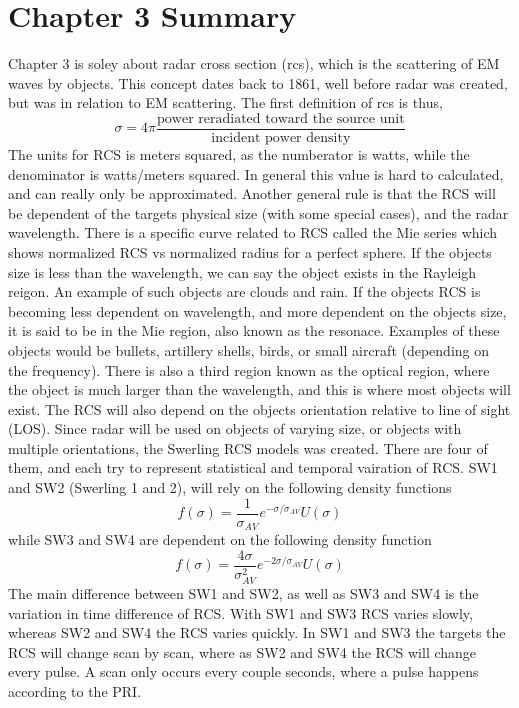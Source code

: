 \documentclass[12pt]{article}
\begin{document}
\section{Chapter 3 Summary}
Chapter 3 is soley about radar cross section (rcs), which is the scattering of EM waves by objects. This concept dates back to 1861, well before radar was created, but was in relation to EM scattering. The first definition of rcs is thus, 
\begin{equation}
    \sigma = 4 \pi \frac{ \mbox{power reradiated toward the source unit} }{ \mbox{incident power density}}
\end{equation}
The units for RCS is meters squared, as the numberator is watts, while the denominator is watts/meters squared. In general this value is hard to calculated, and can really only be approximated. Another general rule is that the RCS will be dependent of the targets physical size (with some special cases), and the radar wavelength. There is a specific curve related to RCS called the Mie series which shows normalized RCS vs normalized radius for a perfect sphere. 
If the objects size is less than the wavelength, we can say the object exists in the Rayleigh reigon. An example of such objects are clouds and rain. If the objects RCS is becoming less dependent on wavelength, and more dependent on the objects size, it is said to be in the Mie region, also known as the resonace. Examples of these objects would be bullets, artillery shells, birds, or small aircraft (depending on the frequency). There is also a third region known as the optical region, where the object is much larger than the wavelength, and this is where most objects will exist. 
The RCS will also depend on the objects orientation relative to line of sight (LOS). Since radar will be used on objects of varying size, or objects with multiple orientations, the Swerling RCS models was created. There are four of them, and each try to represent statistical and temporal vairation of RCS. SW1 and SW2 (Swerling 1 and 2), will rely on the following density functions
\begin{equation}
    f (\sigma) = \frac{1}{\sigma_{AV}} e^{-\sigma / \sigma_{AV}} U(\sigma)
\end{equation}
while SW3 and SW4 are dependent on the following density function
\begin{equation}
    f (\sigma) = \frac{4 \sigma}{\sigma^2_{AV}} e^{-2\sigma / \sigma_{AV}} U(\sigma)
\end{equation}
The main difference between SW1 and SW2, as well as SW3 and SW4 is the variation in time difference of RCS. With SW1 and SW3 RCS varies slowly, whereas SW2 and SW4 the RCS varies quickly. In SW1 and SW3 the targets the RCS will change scan by scan, where as SW2 and SW4 the RCS will change every pulse. A scan only occurs every couple seconds, where a pulse happens according to the PRI.
\end{document}
